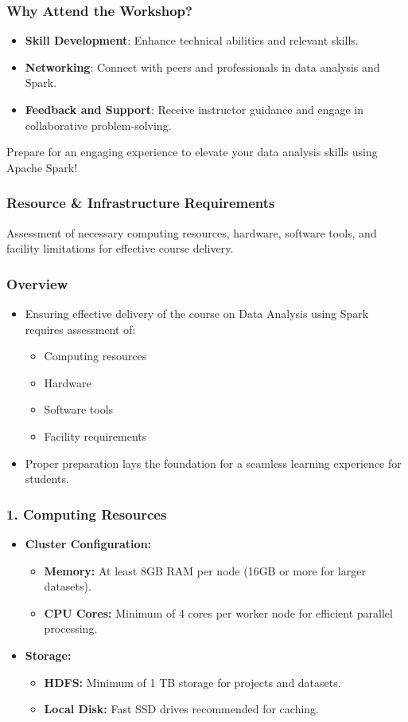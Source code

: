 \documentclass[aspectratio=169]{beamer}
\begin{document}
\begin{frame}[fragile]
    \frametitle{Why Attend the Workshop?}
    \begin{itemize}
        \item \textbf{Skill Development}: Enhance technical abilities and relevant skills.
        \item \textbf{Networking}: Connect with peers and professionals in data analysis and Spark.
        \item \textbf{Feedback and Support}: Receive instructor guidance and engage in collaborative problem-solving.
    \end{itemize}
    Prepare for an engaging experience to elevate your data analysis skills using Apache Spark!
\end{frame}

\begin{frame}
  \frametitle{Resource \& Infrastructure Requirements}
  Assessment of necessary computing resources, hardware, software tools, and facility limitations for effective course delivery.
\end{frame}

\begin{frame}
  \frametitle{Overview}
  \begin{itemize}
    \item Ensuring effective delivery of the course on Data Analysis using Spark requires assessment of:
    \begin{itemize}
      \item Computing resources
      \item Hardware
      \item Software tools
      \item Facility requirements
    \end{itemize}
    \item Proper preparation lays the foundation for a seamless learning experience for students.
  \end{itemize}
\end{frame}

\begin{frame}
  \frametitle{1. Computing Resources}
  \begin{itemize}
    \item \textbf{Cluster Configuration:}
      \begin{itemize}
        \item \textbf{Memory:} At least 8GB RAM per node (16GB or more for larger datasets).
        \item \textbf{CPU Cores:} Minimum of 4 cores per worker node for efficient parallel processing.
      \end{itemize}
    \item \textbf{Storage:}
      \begin{itemize}
        \item \textbf{HDFS:} Minimum of 1 TB storage for projects and datasets.
        \item \textbf{Local Disk:} Fast SSD drives recommended for caching.
      \end{itemize}
  \end{itemize}
\end{frame}
\end{document}
